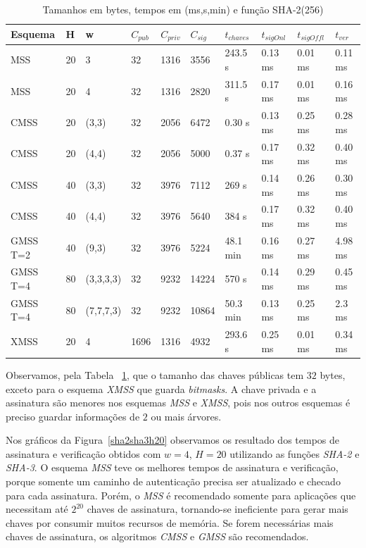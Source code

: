 \documentclass{SBCbookchapter}
\begin{document}
\begin{otherlanguage}{brazilian}
\begin{table}[!ht]
 \center\footnotesize
 \begin{tabular}{|p{2.0cm}|l|l|l|l|l|l|l|l|l|} \hline
   \textbf{Esquema}&\textbf{H} & \textbf{w}   & $C_{pub}$ & $C_{priv}$ & $C_{sig}$  & $t_{chaves}$ & $t_{sigOnl}$&$t_{sigOffl}$ & $t_{ver}$ \\ \hline\hline
   MSS 	    &20& 3&32 & 1316 & 3556 & 243.5 s& 0.13 ms&0.01 ms &0.11 ms\\ \hline
   MSS 	    &20& 4&32 & 1316  & 2820 & 311.5 s& 0.17 ms& 0.01 ms & 0.16 ms\\ \hline\hline
   CMSS	    &20&(3,3)& 32 & 2056 & 6472 & 0.30 s& 0.13 ms&0.25 ms &0.28 ms\\ \hline
   CMSS	    &20&(4,4)& 32 &  2056& 5000  &0.37 s& 0.17 ms& 0.32 ms &0.40 ms\\ \hline
   CMSS  &40&(3,3)& 32 & 3976  & 7112 & 269 s& 0.14 ms& 0.26 ms & 0.30 ms\\ \hline
   CMSS  &40&(4,4)& 32 & 3976  & 5640 & 384 s& 0.17 ms& 0.32 ms & 0.40 ms\\ \hline\hline
   GMSS T=2 &40&(9,3)& 32 & 3976  & 5224 & 48.1 min & 0.16 ms& 0.27 ms & 4.98 ms\\ \hline
   GMSS T=4 & 80& (3,3,3,3)&32 &9232 & 14224  &  570 s& 0.14 ms& 0.29 ms & 0.45 ms\\ \hline
   GMSS T=4 & 80& (7,7,7,3)&32 &9232 & 10864 & 50.3 min& 0.13 ms& 0.25 ms & 2.3 ms\\ \hline\hline
   XMSS	    &20&4& 1696 & 1316 &4932  & 293.6 s& 0.25 ms& 0.01 ms&0.34 ms\\ \hline

 \end{tabular}
 \caption{Tamanhos em bytes, tempos em (ms,s,min) e função SHA-2(256)}
 \label{tabela3}
\end{table}

Observamos, pela Tabela ~\ref{tabela3}, que o tamanho das chaves públicas tem $32$ bytes, exceto para o esquema \textit{XMSS} que guarda \textit{bitmasks}.
A chave privada e a assinatura são menores nos esquemas \textit{MSS} e \textit{XMSS}, pois nos outros esquemas é preciso guardar informações de $2$ ou mais árvores.

Nos gráficos da Figura~\ref{sha2sha3h20} observamos os resultado dos tempos de assinatura e verificação obtidos com $w=4$, $H=20$ utilizando as funções \textit{SHA-2} e \textit{SHA-3}.
O esquema \textit{MSS} teve os melhores tempos de assinatura e verificação, porque somente um caminho de autenticação precisa ser atualizado e checado para cada assinatura. 
Porém, o \textit{MSS} é recomendado somente para aplicações que necessitam até $2^{20}$ chaves de assinatura, tornando-se ineficiente para gerar mais chaves por consumir muitos recursos de memória.
Se forem necessárias mais chaves de assinatura, os algoritmos \textit{CMSS} e \textit{GMSS} são recomendados. 


\end{otherlanguage}
\end{document}
